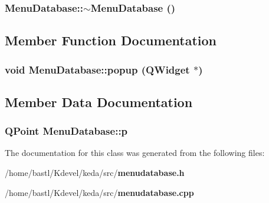 \subsubsection{\setlength{\rightskip}{0pt plus 5cm}Menu\-Database::$\sim$Menu\-Database ()}\label{classMenuDatabase_363aa6d7de6e2d140c4e17f89ad781a7}




\subsection{Member Function Documentation}
\subsubsection{\setlength{\rightskip}{0pt plus 5cm}void Menu\-Database::popup (QWidget $\ast$)\hspace{0.3cm}{\tt  [slot]}}\label{classMenuDatabase_466e13fd34a4781cd8dd864ab67df4da}




\subsection{Member Data Documentation}
\subsubsection{\setlength{\rightskip}{0pt plus 5cm}QPoint {\bf Menu\-Database::p}}\label{classMenuDatabase_83878c91171338902e0fe0fb97a8c47a}




The documentation for this class was generated from the following files:\begin{CompactItemize}
\item 
/home/bastl/Kdevel/keda/src/{\bf menudatabase.h}\item 
/home/bastl/Kdevel/keda/src/{\bf menudatabase.cpp}\end{CompactItemize}
